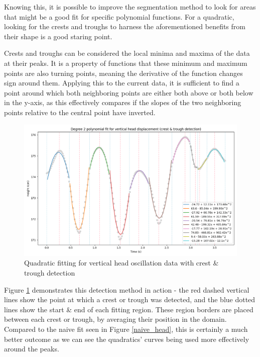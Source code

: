 \documentclass[12pt, a4paper]{article}
\begin{document}
Knowing this, it is possible to improve the segmentation method to look for
areas that might be a good fit for specific polynomial functions. For a
quadratic, looking for the crests and troughs to harness the aforementioned
benefits from their shape is a good staring point.

Crests and troughs can be considered the local minima and maxima of the data at
their peaks. It is a property of functions that these minimum and maximum points
are also turning points, meaning the derivative of the function changes sign
around them. Applying this to the current data, it is sufficient to find a point
around which both neighboring points are either both above or both below in the
y-axis, as this effectively compares if the slopes of the two neighboring
points relative to the central point have inverted.

\begin{figure}[H]
    \centering
    \includegraphics[width=14cm]{p_peaks_head_2.png}
    \caption{ Quadratic fitting for vertical head oscillation data with crest \&
        trough detection} 
    \label{peaks_head}
\end{figure}

Figure \ref{peaks_head} demonstrates this detection method in action - the red
dashed vertical lines show the point at which a crest or trough was detected,
and the blue dotted lines show the start \& end of each fitting region. These
region borders are placed between each crest or trough, by averaging their
position in the domain. Compared to the naive fit seen in Figure
\ref{naive_head}, this is certainly a much better outcome as we can see the
quadratics' curves being used more effectively around the peaks.
\end{document}
